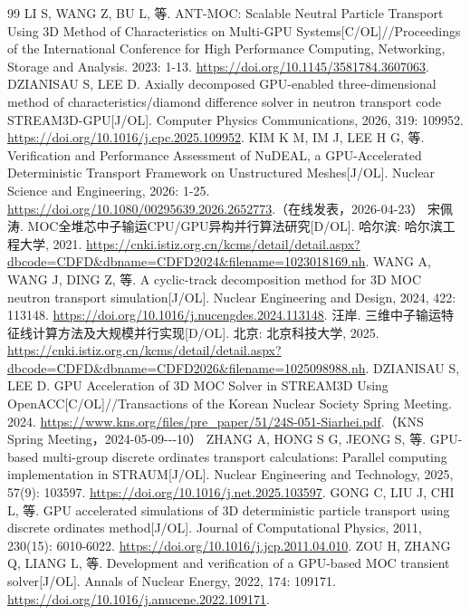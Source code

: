 \documentclass[UTF8, zihao=-4, fontset=none, a4paper]{ctexart}
\begin{document}
\begin{thebibliography}{99}
 LI S, WANG Z, BU L, 等. ANT-MOC: Scalable Neutral Particle Transport Using 3D Method of Characteristics on Multi-GPU Systems{[}C/OL{]}//Proceedings of the International Conference for High Performance Computing, Networking, Storage and Analysis. 2023: 1-13. \url{https://doi.org/10.1145/3581784.3607063}.
 DZIANISAU S, LEE D. Axially decomposed GPU-enabled three-dimensional method of characteristics/diamond difference solver in neutron transport code STREAM3D-GPU{[}J/OL{]}. Computer Physics Communications, 2026, 319: 109952. \url{https://doi.org/10.1016/j.cpc.2025.109952}.
 KIM K M, IM J, LEE H G, 等. Verification and Performance Assessment of NuDEAL, a GPU-Accelerated Deterministic Transport Framework on Unstructured Meshes{[}J/OL{]}. Nuclear Science and Engineering, 2026: 1-25. \url{https://doi.org/10.1080/00295639.2026.2652773}.（在线发表，2026-04-23）
 宋佩涛. MOC全堆芯中子输运CPU/GPU异构并行算法研究{[}D/OL{]}. 哈尔滨: 哈尔滨工程大学, 2021. \url{https://cnki.istiz.org.cn/kcms/detail/detail.aspx?dbcode=CDFD&dbname=CDFD2024&filename=1023018169.nh}.
 WANG A, WANG J, DING Z, 等. A cyclic-track decomposition method for 3D MOC neutron transport simulation{[}J/OL{]}. Nuclear Engineering and Design, 2024, 422: 113148. \url{https://doi.org/10.1016/j.nucengdes.2024.113148}.
 汪岸. 三维中子输运特征线计算方法及大规模并行实现{[}D/OL{]}. 北京: 北京科技大学, 2025. \url{https://cnki.istiz.org.cn/kcms/detail/detail.aspx?dbcode=CDFD&dbname=CDFD2026&filename=1025098988.nh}.
 DZIANISAU S, LEE D. GPU Acceleration of 3D MOC Solver in STREAM3D Using OpenACC{[}C/OL{]}//Transactions of the Korean Nuclear Society Spring Meeting. 2024. \url{https://www.kns.org/files/pre_paper/51/24S-051-Siarhei.pdf}.（KNS Spring Meeting，2024-05-09-\/-\/-10）
 ZHANG A, HONG S G, JEONG S, 等. GPU-based multi-group discrete ordinates transport calculations: Parallel computing implementation in STRAUM{[}J/OL{]}. Nuclear Engineering and Technology, 2025, 57(9): 103597. \url{https://doi.org/10.1016/j.net.2025.103597}.
 GONG C, LIU J, CHI L, 等. GPU accelerated simulations of 3D deterministic particle transport using discrete ordinates method{[}J/OL{]}. Journal of Computational Physics, 2011, 230(15): 6010-6022. \url{https://doi.org/10.1016/j.jcp.2011.04.010}.
 ZOU H, ZHANG Q, LIANG L, 等. Development and verification of a GPU-based MOC transient solver{[}J/OL{]}. Annals of Nuclear Energy, 2022, 174: 109171. \url{https://doi.org/10.1016/j.anucene.2022.109171}.

\end{thebibliography}
\end{document}
